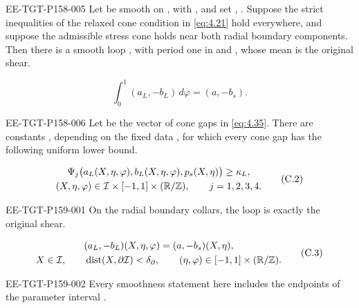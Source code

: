 \begin{lemma}\label{lem:C.1}
\begin{EESegment}{EE-TGT-P158-005}
Let  be smooth on , with
, and set
, .
Suppose the strict inequalities of the relaxed cone condition in \eqref{eq:4.21} hold everywhere, and suppose the
admissible stress cone holds near both radial boundary components. Then there is a
smooth loop , with period one in  and
, whose mean is the original shear.
\end{EESegment}
\begin{equation}
 \int_0^1 (a_L,-b_L)\,d\varphi=(a,-b_s).
\tag{C.1}\label{eq:C.1}
\end{equation}
\begin{EESegment}{EE-TGT-P158-006}
Let  be the vector of cone gaps in \eqref{eq:4.35}. There are constants
, depending on the fixed data
, for which every cone gap has the following uniform lower bound.
\end{EESegment}
\begin{equation}
\begin{gathered}
 \Psi_j\bigl(a_L(X,\eta,\varphi),b_L(X,\eta,\varphi),p_s(X,\eta)\bigr)\geq\kappa_L,\\
 (X,\eta,\varphi)\in\mathcal I\times[-1,1]\times(\mathbb{R}/\mathbb{Z}),
 \qquad j=1,2,3,4.
\end{gathered}
\tag{C.2}\label{eq:C.2}
\end{equation}
%
\begin{EESegment}{EE-TGT-P159-001}
On the radial boundary collars, the loop is exactly the original shear.
\end{EESegment}
\begin{equation}
\begin{gathered}
 (a_L,-b_L)(X,\eta,\varphi)=(a,-b_s)(X,\eta),\\
 X\in\mathcal I,\qquad \operatorname{dist}(X,\partial\mathcal I)<\delta_\partial,
 \qquad (\eta,\varphi)\in[-1,1]\times(\mathbb{R}/\mathbb{Z}).
\end{gathered}
\tag{C.3}\label{eq:C.3}
\end{equation}
\begin{EESegment}{EE-TGT-P159-002}
Every smoothness statement here includes the endpoints of the parameter interval
.
\end{EESegment}
\end{lemma}

